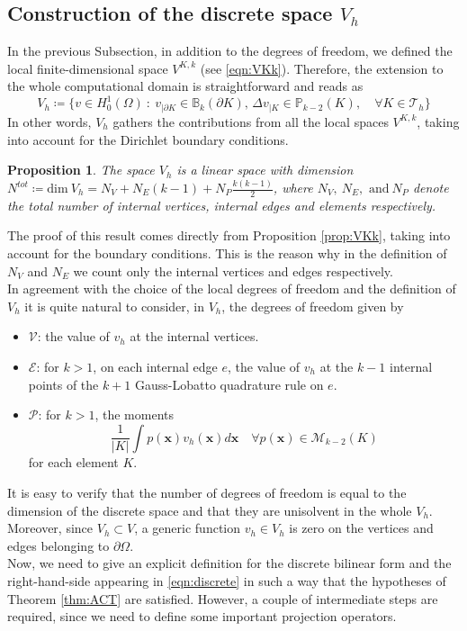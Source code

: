 \documentclass[10pt]{article}
\newtheorem{prop}{Proposition}
\begin{document}
\subsection{Construction of the discrete space $V_h$}
In the previous Subsection, in addition to the degrees of freedom, we defined the local finite-dimensional space $V^{K,k}$ (see \eqref{eqn:VKk}). Therefore, the extension to the whole computational domain is straightforward and reads as
\begin{equation}
	V_h \coloneqq \lbrace v \in H^1_0(\Omega) \ : \ v_{|\partial K} \in \mathbb{B}_k(\partial K), \, \Delta v_{|K} \in \mathbb{P}_{k-2}(K), \quad \forall K \in \mathcal{T}_h \rbrace
\end{equation}
In other words, $V_h$ gathers the contributions from all the local spaces $V^{K,k}$, taking into account for the Dirichlet boundary conditions. \\
\begin{prop}
	The space $V_h$ is a linear space with dimension $N^{tot} \coloneqq \text{dim} \ V_h= N_V + N_E (k-1) + N_P \frac{k(k-1)}{2}$, where $N_V, \ N_E, \text{ and} \ N_P$ denote the total number of internal vertices, internal edges and elements respectively.
\end{prop}
The proof of this result comes directly from Proposition \ref{prop:VKk}, taking into account for the boundary conditions. This is the reason why in the definition of $N_V$ and $N_E$ we count only the internal vertices and edges respectively. \\
In agreement with the choice of the local degrees of freedom and the definition of $V_h$ it is quite natural to consider, in $V_h$, the degrees of freedom given by
\begin{itemize}
	\item $\mathcal{V}$: the value of $v_h$ at the internal vertices.
	\item $\mathcal{E}$: for $k>1$, on each internal edge $e$, the value of $v_h$ at the $k-1$ internal points of the $k+1$ Gauss-Lobatto quadrature rule on $e$.
	\item $\mathcal{P}$: for $k>1$, the moments
	$$\frac{1}{|K|} \int p(\mathbf{x})v_h(\mathbf{x})d\mathbf{x} \quad \forall p(\mathbf{x}) \in \mathcal{M}_{k-2}(K)$$
	for each element $K$.
\end{itemize}
It is easy to verify that the number of degrees of freedom is equal to the dimension of the discrete space and that they are unisolvent in the whole $V_h$. Moreover, since $V_h \subset V$, a generic function $v_h \in V_h$ is zero on the vertices and edges belonging to $\partial \Omega$.\\
Now, we need to give an explicit definition for the discrete bilinear form and the right-hand-side appearing in \eqref{eqn:discrete} in such a way that the hypotheses of Theorem \ref{thm:ACT} are satisfied. However, a couple of intermediate steps are required, since we need to define some important projection operators.
\end{document}
